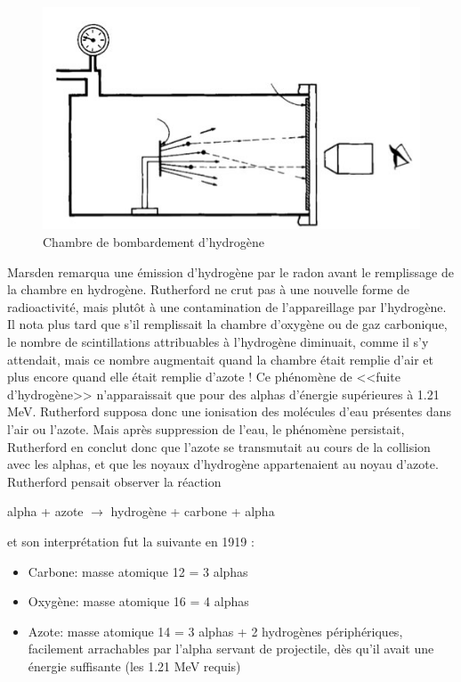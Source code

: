 \begin{figure}[ht]
    \centering
    \includegraphics[scale=0.75]{Images1/bombardement.PNG}
    \caption{Chambre de bombardement d'hydrogène}
    \label{fig:chambre_bombardement_H}
\end{figure}


Marsden remarqua une émission d'hydrogène par le radon avant le remplissage de la chambre en hydrogène. Rutherford ne crut pas à une nouvelle forme de radioactivité, mais plutôt à une contamination de l'appareillage par l'hydrogène. Il nota plus tard que s'il remplissait la chambre d'oxygène ou de gaz carbonique, le nombre de scintillations attribuables à l'hydrogène diminuait, comme il s'y attendait, mais ce nombre augmentait quand la chambre était remplie d'air et plus encore quand elle était remplie d'azote ! Ce phénomène de <<fuite d'hydrogène>> n'apparaissait que pour des alphas d'énergie supérieures à 1.21 MeV. Rutherford supposa donc une ionisation des molécules d'eau présentes dans l'air ou l'azote. Mais après suppression de l'eau, le phénomène persistait, Rutherford en conclut donc que l'azote se transmutait au cours de la collision avec les alphas, et que les noyaux d'hydrogène appartenaient au noyau d'azote. Rutherford pensait observer la réaction
\begin{center}
    alpha + azote $\longrightarrow$ hydrogène + carbone + alpha
\end{center}
et son interprétation fut la suivante en 1919 :

\begin{itemize}
    \item Carbone: masse atomique 12 = 3 alphas
    \item Oxygène: masse atomique 16 = 4 alphas
    \item Azote: masse atomique 14 = 3 alphas + 2 hydrogènes périphériques, facilement arrachables par l’alpha servant de projectile, dès qu’il avait une énergie suffisante (les 1.21 MeV requis)
\end{itemize}

